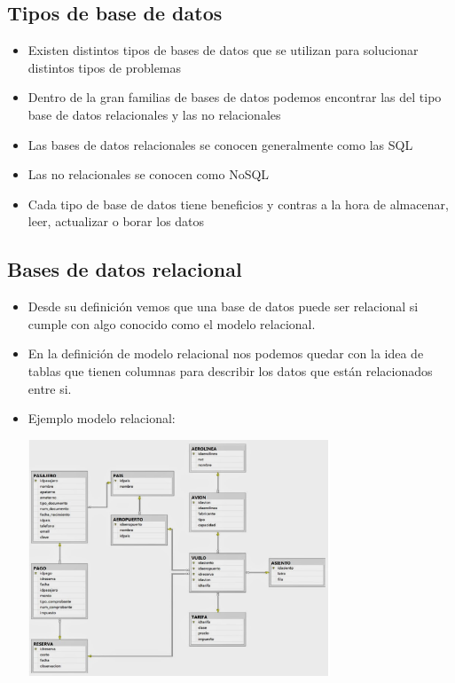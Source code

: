 \documentclass[%
 reprint,
 amsmath,amssymb,
 aps,
]{revtex4-1}
\begin{document}
\subsection{Tipos de base de datos}
	          \begin{itemize}
		\item Existen distintos tipos de bases de datos que se utilizan para solucionar distintos tipos de problemas
                     \item Dentro de la gran familias de bases de datos podemos encontrar las del tipo base de datos relacionales y las no relacionales
		\item Las bases de datos relacionales se conocen generalmente como las SQL
		\item Las no relacionales se conocen como NoSQL
		\item Cada tipo de base de datos tiene beneficios y contras a la hora de almacenar, leer, actualizar o borar los datos
	           \end{itemize}
\subsection{Bases de datos relacional}
	          \begin{itemize}
		\item Desde su definición vemos que una base de datos puede ser relacional si cumple con algo conocido como el modelo relacional.
                     \item En la definición de modelo relacional nos podemos quedar con la idea de tablas que tienen columnas para describir los datos que están relacionados entre si.
		\item Ejemplo modelo relacional:\cite{Nicolas}
                     \begin{center}
		\includegraphics[width=9cm]{./Imagenes/1}
		\end{center}	
	          \end{itemize}
\end{document}

